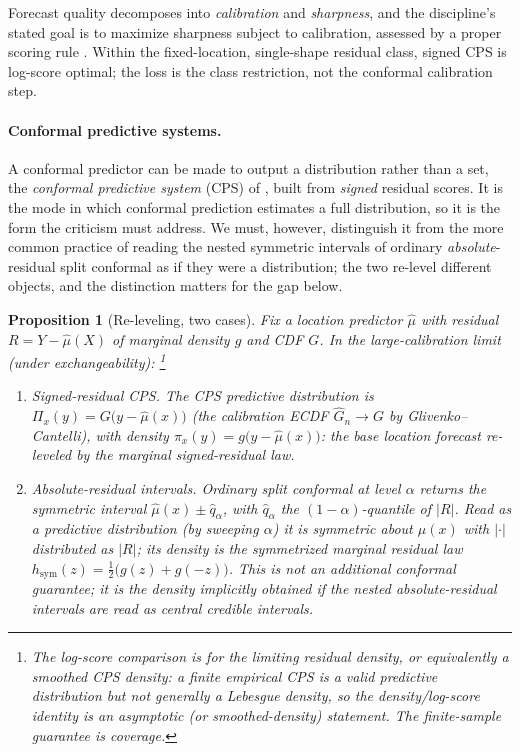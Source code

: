 \documentclass[10pt]{article} %
\newtheorem{proposition}{Proposition}
\theoremstyle{definition}
\begin{document}
Forecast quality decomposes into \emph{calibration} and
\emph{sharpness}, and the discipline's stated goal is to maximize sharpness subject to
calibration, assessed by a proper scoring rule
\citep{gneiting2007probabilistic,gneiting2007strictly}. Within the fixed-location,
single-shape residual class, signed CPS is log-score optimal; the loss is the class
restriction, not the conformal calibration step.

\paragraph{Conformal predictive systems.} A conformal predictor can be made to output a
distribution rather than a set, the \emph{conformal predictive system} (CPS) of
\citet{vovk2019nonparametric}, built from \emph{signed} residual scores. It is the mode in which conformal
prediction estimates a full distribution, so it is the form the criticism must address. We must, however, distinguish it from the more
common practice of reading the nested symmetric intervals of ordinary
\emph{absolute}-residual split conformal as if they were a distribution; the two re-level
different objects, and the distinction matters for the gap below.

\begin{proposition}[Re-leveling, two cases]\label{prop:relevel}
Fix a location predictor $\hat\mu$ with residual $R=Y-\hat\mu(X)$ of marginal density
$g$ and CDF $G$. In the large-calibration limit (under exchangeability):%
\footnote{The log-score comparison is for the limiting residual density, or equivalently a
smoothed CPS density: a finite empirical CPS is a valid predictive distribution but not
generally a Lebesgue density, so the density/log-score identity is an asymptotic (or
smoothed-density) statement. The finite-sample guarantee is coverage.}
\begin{enumerate}
\item[(A)] Signed-residual CPS. The CPS predictive distribution is
$\Pi_x(y)=G\big(y-\hat\mu(x)\big)$ (the calibration ECDF $\widehat G_n\to G$ by
Glivenko--Cantelli), with density $\pi_x(y)=g\big(y-\hat\mu(x)\big)$: the base location
forecast re-leveled by the marginal signed-residual law.
\item[(B)] Absolute-residual intervals. Ordinary split conformal at
level $\alpha$ returns the symmetric interval $\hat\mu(x)\pm \hat q_\alpha$, with
$\hat q_\alpha$ the $(1-\alpha)$-quantile of $|R|$. Read as a predictive distribution
(by sweeping $\alpha$) it is symmetric about $\hat\mu(x)$ with $|{\cdot}|$ distributed as
$|R|$; its density is the \emph{symmetrized} marginal residual law
$h_{\mathrm{sym}}(z)=\tfrac12\big(g(z)+g(-z)\big)$. This is not an additional conformal
guarantee; it is the density implicitly obtained if the nested absolute-residual intervals
are read as central credible intervals.
\end{enumerate}
\end{proposition}
\end{document}
